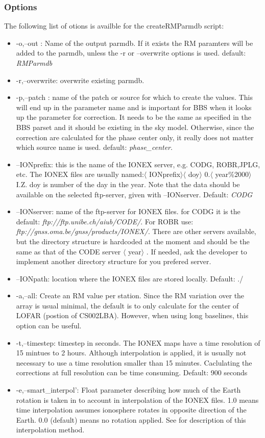 \documentclass{article}
\begin{document}
\subsubsection{Options}

The following list of otions is availble for the createRMParmdb script:
\begin{itemize}
\item -o,--out : Name of the output parmdb. If it exists the RM paramters will
  be added to the parmdb, unless the -r or --overwrite options is
  used. default: \emph{RMParmdb}
\item -r,--overwrite: overwrite existing parmdb.
\item -p,--patch : name of the patch or source for which to create the
  values. This will end up in the parameter name and is important for BBS when
  it looks up the parameter for correction. It needs to be the same as
  specified in the BBS parset and it should be existing in the sky
  model. Otherwise, since the correction are calculated for the phase center
  only, it really does not matter which source name is used. default:
  \emph{phase\_center}.
\item --IONprefix: this is the name of the IONEX server, e.g. CODG, ROBR,JPLG,
  etc. The IONEX files are usually named:$\langle$ IONprefix$\rangle$$\langle$
  doy$\rangle$ 0.$\langle$ year\%2000$\rangle$ I.Z. doy
  is number of the day in the year. Note
  that the data should be available on the selected ftp-server, given with
  --IONserver. Default: \emph{CODG}
\item --IONserver: name of the ftp-server for IONEX files. for CODG it is the
  default: \emph{ftp://ftp.unibe.ch/aiub/CODE/}. For ROBR use:
  \emph{ftp://gnss.oma.be/gnss/products/IONEX/}. There are other servers
  available, but the directory structure is hardcoded at the moment and should
  be the same as that of the CODE server $\langle$ year$\rangle$ . If needed, ask the developer to
  implement another directory structure for you prefered server.
\item --IONpath: location where the IONEX files are stored locally. Default: ./
\item -a,--all: Create an RM value per station. Since the RM variation over
  the array is usual minimal, the default is to only calculate for the center
  of LOFAR (postion of CS002LBA). However, when using long baselines, this option can be useful.
\item -t,--timestep: timestep in seconds. The IONEX maps have a time resolution of
  15 mintues to 2 hours. Although interpolation is applied, it is usually not
  necessary to use a time resolution smaller than 15 minutes. Caclulating the
  corrections at full resolution can be time consuming.  Default: 900 seconds
\item -e,--smart\_interpol': Float parameter describing how much of the Earth
  rotation is taken in to account in interpolation of the IONEX files. 1.0
  means time interpolation assumes ionosphere rotates in opposite direction of
  the Earth. 0.0 (default) means no rotation applied. See \cite{ionex} for
  description of this interpolation method.

\end{itemize}
 
\end{document}
